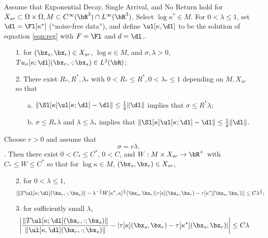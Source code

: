 \begin{theorem}
  \label{thm:main}
  Assume that Exponential Decay, Single Arrival, and No Return
  hold for $X_{sr} \subset \Omega \times \Omega, M \subset C^{\infty}(\bR^3) \cap L^{\infty}(\bR^3)$.
  Select $\log \kappa^* \in M$. For $0 <
  \lambda \le 1$, set
  $\dl=\Fl[\kappa^*]$ (``noise-free data''), and  define $\ul[\kappa,\dl]$
  to be the solution of 
  equation \ref{eqn:reg} with $F=\Fl$ and $d=\dl$..
  
  \begin{itemize}
  \item[1. ] for $(\bx_s,\bx_r) \in X_{sr}$, $\log \kappa \in M$, and
    $\sigma, \lambda >0$, $Tu_{\sigma}[\kappa;\dl](\bx_r,\cdot;\bx_s) \in
    L^2(\bR)$;
  \item[2. ] There exist $R_*,R^*,\lambda_*$ with $0<R_*\le R^*, 0 <
    \lambda_*\le 1$ depending on
    $M, X_{sr}$ so that
    \begin{itemize}
    \item[a. ] $\|\Sl[\kappa]\ul[\kappa;\dl]-\dl\| \le
      \frac{1}{2}\|\dl\|$ implies that $\sigma \le R^*\lambda$;
    \item[b. ] $\sigma \le R_*\lambda$ and $\lambda \le \lambda_*$
      implies that $\|\Sl[\kappa]\ul[\kappa;\dl]-\dl\| \le
      \frac{1}{2}\|\dl\|$.
    \end{itemize}
  \end{itemize}
  Choose $r > 0$ and assume that
  \begin{equation}
    \label{eqn:lamsig}
    \sigma = r \lambda.
  \end{equation}.
  Then there exist $0 < C_* \le C^*$, $0 < C$, and $W: M \times X_{sr}
  \rightarrow \bR^+$ with $C_* \le
  W \le C^*$ so that for
  $\log \kappa \in M$, $(\bx_s,\bx_r) \in X_{sr}$,
  \begin{itemize}
  \item[2. ] for $0 <  \lambda \le 1$, 
    \begin{equation}
      \label{eqn:mswitt}
      |\|T\ul[\kappa;\dl](\bx_r,\cdot;\bx_s)\|- \lambda^{-\frac{1}{2}} W[\kappa^*,\kappa]^{\frac{1}{2}}(\bx_s,\bx_r)|\tau[\kappa](\bx_s,\bx_r)-\tau[\kappa^*](\bx_s,\bx_r)|| \le C
      \lambda^{\frac{1}{2}};
    \end{equation}
  \item[3. ]for sufficiently small $\lambda$, 
    \begin{equation}
      \label{eqn:awitt}
      \left|\frac{\|T\ul[\kappa;\dl](\bx_r,\cdot;\bx_s)\|}{\|\ul[\kappa,\dl](\bx_r,\cdot;\bx_s)\|}-
        |\tau[\kappa](\bx_s,\bx_r)-\tau[\kappa^*](\bx_s,\bx_r)|\right| \le C \lambda
    \end{equation}
  \end{itemize}
\end{theorem}
